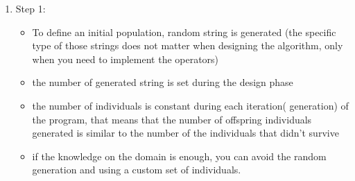 \documentclass{article}
\begin{document}
	\begin{enumerate}
		\item Step 1: 
		\newline
		\begin{itemize}
			\item To define an initial population, random string is generated (the specific type of those strings does not matter when designing the algorithm, only when you need to implement the operators)
			\item the number of generated string is set during the design phase
			\item the number of individuals is constant during each iteration( generation) of the program, that means that the number of offspring individuals generated is similar to the number of the individuals that didn't survive
			\item if the knowledge on the domain is enough, you can avoid the random generation and using a custom set of individuals.
		\end{itemize}
		

\end{enumerate}
\end{document}
